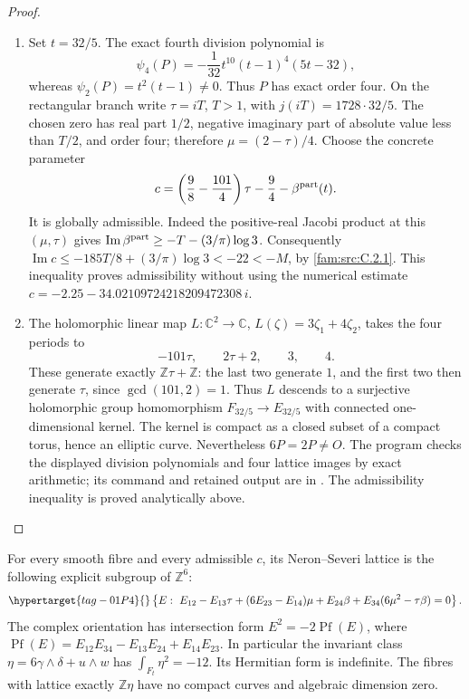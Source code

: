 \begin{proof}
\begin{enumerate}[label=\arabic*.,leftmargin=*]
\item Set \(t=32/5\). The exact fourth division polynomial is
\[
 \psi_4(P)=-\frac1{32}t^{10}(t-1)^4(5t-32),
\]
whereas \(\psi_2(P)=t^2(t-1)\ne0\). Thus \(P\) has exact order four.
On the rectangular branch write \(\tau=iT\), \(T>1\), with
\(j(iT)=1728\cdot32/5\). The chosen zero has real part \(1/2\), negative
imaginary part of absolute value less than \(T/2\), and order four;
therefore \(\mu=(2-\tau)/4\). Choose the concrete parameter
\[
 c=\left(\frac98-\frac{101}{4}\right)\tau-\frac94
       -\beta^{\rm part}(t).
\]
It is globally admissible. Indeed the positive-real Jacobi product at this
\((\mu,\tau)\) gives
\(\operatorname{Im}\beta^{\rm part}\geq-T-(3/\pi)\log3\).
Consequently
\(\operatorname{Im}c\leq-185T/8+(3/\pi)\log3<-22<-M\), by \ref{fam:src:C.2.1}.
This inequality proves admissibility without using the numerical estimate
\(c=-2.25-34.02109724218209472308\,i\).

\item The holomorphic linear map \(L:\mathbb C^2\to\mathbb C\),
\(L(\zeta)=3\zeta_1+4\zeta_2\), takes the four periods to
\[
 -101\tau,\qquad2\tau+2,\qquad3,\qquad4.
\]
These generate exactly \(\mathbb Z\tau+\mathbb Z\): the last two generate
\(1\), and the first two then generate \(\tau\), since
\(\gcd(101,2)=1\). Thus \(L\) descends to a surjective holomorphic group
homomorphism \(F_{32/5}\to E_{32/5}\) with connected one-dimensional
kernel. The kernel is compact as a closed subset of a compact torus,
hence an elliptic curve. Nevertheless \(6P=2P\ne O\).
The program  checks the displayed
division polynomials and four lattice images by exact arithmetic; its
command and retained output are in .
The admissibility inequality is proved analytically above.
\end{enumerate}
\end{proof}

\begin{proposition}\hypertarget{tag-01QU}{}\label{fam:src:D.1.4}\label{fam:st:D.1.4}

For every smooth fibre and every admissible \(c\), its Neron--Severi lattice
is the following explicit subgroup of \(\mathbb Z^6\):
\begin{equation}\hypertarget{tag-01P4}{}\label{fam:eq:cd-NS}
 \left\{E:\ E_{12}-E_{13}\tau+(6E_{23}-E_{14})\mu+
 E_{24}\beta+E_{34}(6\mu^2-\tau\beta)=0\right\}.
\end{equation}
The complex orientation has intersection form
\(E^2=-2\operatorname{Pf}(E)\), where
\(\operatorname{Pf}(E)=E_{12}E_{34}-E_{13}E_{24}+E_{14}E_{23}\).
In particular the invariant class \(\eta=6\gamma\wedge\delta+u\wedge w\)
has \(\int_{F_t}\eta^2=-12\). Its Hermitian form is indefinite.
The fibres with lattice exactly \(\mathbb Z\eta\) have no compact curves
and algebraic dimension zero.
\end{proposition}


